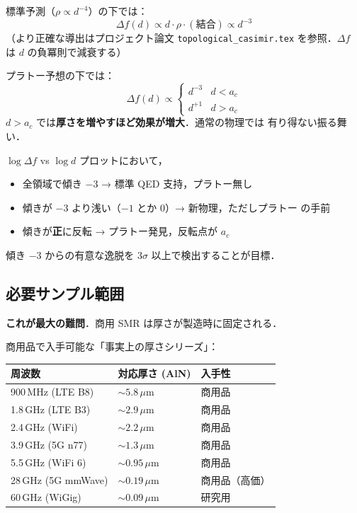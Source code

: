 \documentclass[11pt,a4paper]{article}
\begin{document}
標準予測（$\rho \propto d^{-4}$）の下では：
\begin{equation}
  \Delta f(d) \propto d \cdot \rho \cdot (\text{結合}) \propto d^{-3}
\end{equation}
（より正確な導出はプロジェクト論文 \texttt{topological\_casimir.tex}
を参照．$\Delta f$ は $d$ の負冪則で減衰する）

プラトー予想の下では：
\begin{equation}
  \Delta f(d) \propto \begin{cases}
    d^{-3} & d < a_c \\
    d^{+1} & d > a_c
  \end{cases}
\end{equation}
$d > a_c$ では\textbf{厚さを増やすほど効果が増大}．通常の物理では
有り得ない振る舞い．

\begin{tcolorbox}[colback=yellow!5,colframe=orange!60!black,title=判定基準]
$\log\Delta f$ vs $\log d$ プロットにおいて，
\begin{itemize}
\item 全領域で傾き $-3$ → 標準 QED 支持，プラトー無し
\item 傾きが $-3$ より浅い（$-1$ とか $0$）→ 新物理，ただしプラトー
の手前
\item 傾きが\textbf{正}に反転 → プラトー発見，反転点が $a_c$
\end{itemize}
傾き $-3$ からの有意な逸脱を $3\sigma$ 以上で検出することが目標．
\end{tcolorbox}

\subsection{必要サンプル範囲}

\textbf{これが最大の難問}．商用 SMR は厚さが製造時に固定される．

商用品で入手可能な「事実上の厚さシリーズ」：

\begin{center}
\begin{tabular}{lll}
\toprule
周波数 & 対応厚さ (AlN) & 入手性 \\
\midrule
900\,MHz (LTE B8) & $\sim 5.8\,\mu$m & 商用品 \\
1.8\,GHz (LTE B3) & $\sim 2.9\,\mu$m & 商用品 \\
2.4\,GHz (WiFi) & $\sim 2.2\,\mu$m & 商用品 \\
3.9\,GHz (5G n77) & $\sim 1.3\,\mu$m & 商用品 \\
5.5\,GHz (WiFi 6) & $\sim 0.95\,\mu$m & 商用品 \\
28\,GHz (5G mmWave) & $\sim 0.19\,\mu$m & 商用品（高価）\\
60\,GHz (WiGig) & $\sim 0.09\,\mu$m & 研究用 \\
\bottomrule
\end{tabular}
\end{center}
\end{document}
